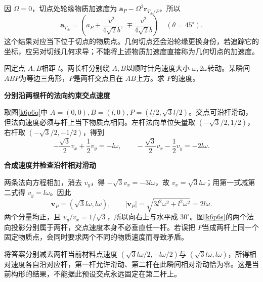 \begin{solution}
因 $\dot\Omega=0$，切点处轮缘物质加速度为 $\bm a_P-\Omega^2\bm r_{T_\pm/P}$，所以
\[\bm a_{T_\pm}=\left(a_P+\frac{v^2}{4\sqrt2b},\ \mp\frac{v^2}{4\sqrt2b}\right)
\quad(\theta=45^\circ).\]
这个结果对应当下位于切点的物质点。几何切点还会沿轮缘更换身份，若追踪它的坐标，应另对切线几何求导；不能将上述物质加速度直接称为几何切点的加速度。
\end{solution}

\begin{question}\begin{example}[两转杆的几何交点]\label{k6p6}
固定点 $A,B$相距 $l$。两长杆分别绕 $A,B$以顺时针角速度大小 $\omega,2\omega$转动。某瞬间 $ABP$为等边三角形，$P$是两杆交点且在 $AB$上方。求 $P$的速度。\end{example}
\end{question}
\begin{solution}\textbf{分别沿两根杆的法向约束交点速度}\par\nobreak
取图\ref{k6p6q}中 $A=(0,0),B=(l,0),P=(l/2,\sqrt3l/2)$。交点可沿杆滑动，但法向速度必须与杆上当下物质点相同。左杆法向单位矢量取 $(-\sqrt3/2,1/2)$，右杆取 $(-\sqrt3/2,-1/2)$，得到
\[-\frac{\sqrt3}{2}v_x+\frac12v_y=-l\omega,\qquad -\frac{\sqrt3}{2}v_x-\frac12v_y=-2l\omega.\]



\par\medskip{}\noindent\textbf{合成速度并检查沿杆相对滑动}\par\nobreak
两条法向方程相加，消去 $v_y$，得 $-\sqrt3v_x=-3l\omega$，故 $v_x=\sqrt3l\omega$；用第一式减第二式得 $v_y=l\omega$。因此
\[
 \boxed{\bm v_P=(\sqrt3l\omega,l\omega)},\qquad
 |\bm v_P|=\sqrt{3l^2\omega^2+l^2\omega^2}=2l\omega.
\]
两个分量均正，且 $v_y/v_x=1/\sqrt3$，所以向右上与水平成 $30^\circ$。图\ref{k6p6s}的两个法向投影分别属于两杆，交点速度本身不必垂直任一杆。若误把 $P$当成两杆上同一个固定物质点，会同时要求两个不同的物质速度而导致矛盾。

将答案分别减去两杆当前材料点速度 $(\sqrt3l\omega/2,-l\omega/2)$与 $(\sqrt3l\omega,l\omega)$，所得相对速度各自沿对应杆，第一杆允许滑动、第二杆在此瞬间相对滑动恰为零。这是当前构形的结果，不能据此预设交点永远固定在第二杆上。\end{solution}

